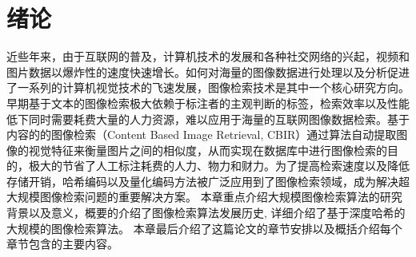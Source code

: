 
\chapter{绪论}
近些年来，由于互联网的普及，计算机技术的发展和各种社交网络的兴起，视频和图片数据以爆炸性的速度快速增长。如何对海量的图像数据进行处理以及分析促进了一系列的计算机视觉技术的飞速发展，图像检索技术是其中一个核心研究方向。早期基于文本的图像检索极大依赖于标注者的主观判断的标签，检索效率以及性能低下同时需要耗费大量的人力资源，难以应用于海量的互联网图像数据检索。基于内容的的图像检索（Content Based Image Retrieval, CBIR）通过算法自动提取图像的视觉特征来衡量图片之间的相似度，从而实现在数据库中进行图像检索的目的，极大的节省了人工标注耗费的人力、物力和财力。为了提高检索速度以及降低存储开销，哈希编码以及量化编码方法被广泛应用到了图像检索领域，成为解决超大规模图像检索问题的重要解决方案。 本章重点介绍大规模图像检索算法的研究背景以及意义，概要的介绍了图像检索算法发展历史, 详细介绍了基于深度哈希的大规模的图像检索算法。 本章最后介绍了这篇论文的章节安排以及概括介绍每个章节包含的主要内容。
